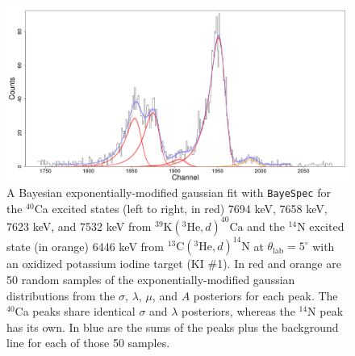 \begin{figure}
\centering
\includegraphics[width=6.5in]{Chapter-6/figs/EMG_Multiplet.png}
\caption{\label{fig:EMG_Multiplet}A Bayesian exponentially-modified gaussian fit with \texttt{BayeSpec} for the $^{40}$Ca excited states (left to right, in red) 7694 keV, 7658 keV, 7623 keV, and 7532 keV from $^{39}\mathrm{K}(^{3}\mathrm{He},d)^{40}\mathrm{Ca}$ and the $^{14}$N excited state (in orange) 6446 keV from $^{13}\mathrm{C}(^{3}\mathrm{He},d)^{14}\mathrm{N}$ at $\theta_{\mathrm{lab}} = 5^{\circ}$ with an oxidized potassium iodine target (KI $\#$1). In red and orange are 50 random samples of the exponentially-modified gaussian distributions from the $\sigma$, $\lambda$, $\mu$, and $A$ posteriors for each peak. The $^{40}$Ca peaks share identical $\sigma$ and $\lambda$ posteriors, whereas the $^{14}$N peak has its own. In blue are the sums of the peaks plus the background line for each of those 50 samples.}
\end{figure}



